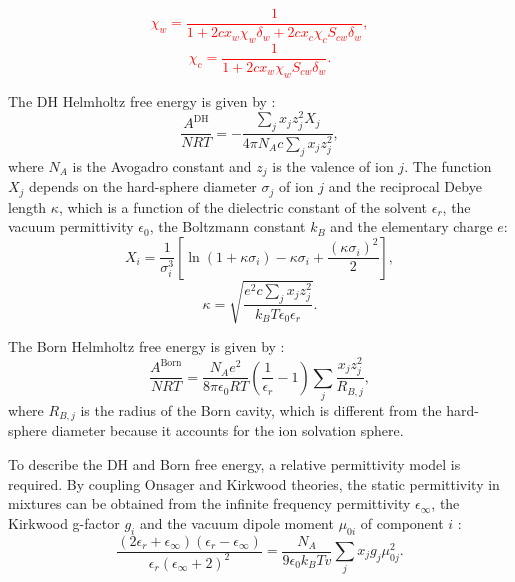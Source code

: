 \textcolor{red}{
\begin{equation}
     \chi_w = \frac{1}{1+2cx_w\chi_w\delta_w+2cx_c\chi_cS_{cw}\delta_w}, 
    \label{chiw_withCO2}
\end{equation}
\begin{equation}
    \chi_c = \frac{1}{1+2cx_w\chi_wS_{cw}\delta_w}.
    \label{chic}
\end{equation}
}

The DH Helmholtz free energy is given by \cite{Debye1923}: 
\begin{equation}
        \frac{A^\text{DH}}{NRT} = -\frac{\sum_j x_j z_j^2 X_j}{4\pi N_A c \sum_j x_j z_j^2}, 
        \label{Eq:ADH}
\end{equation}
where $N_A$ is the Avogadro constant and $z_j$ is the valence of ion $j$. The function $X_j$ depends on the hard-sphere diameter $\sigma_j$ of ion $j$ and the reciprocal Debye length $\kappa$, which is a function of the dielectric constant of the solvent $\epsilon_r$, the vacuum permittivity $\epsilon_0$, the Boltzmann constant $k_B$ and the elementary charge $e$:
\begin{equation}
        X_i = \frac{1}{\sigma_i^3} \left [ \ln { \left (1 + \kappa \sigma_i \right )} - \kappa \sigma_i + \frac{\left ( \kappa \sigma_i \right)^2}{2} \right ],
        \label{Eq:ADH_Xi}
\end{equation}
\begin{equation}
        \kappa = \sqrt{\frac{e^2c\sum_jx_jz_j^2}{k_BT\epsilon_0\epsilon_r}}.
        \label{Eq:ADH_debye}
\end{equation}

The Born Helmholtz free energy is given by \cite{Michelsen2004}: 
\begin{equation}
        \frac{A^\text{Born}}{NRT} = \frac{N_A e^2}{8\pi \epsilon_0RT } \left ( \frac{1}{\epsilon_r} - 1\right ) \sum_j \frac{x_jz_j^2}{R_{B,j}},
        \label{ABorn}
\end{equation}
where $R_{B,j}$ is the radius of the Born cavity, which is different from the hard-sphere diameter because it accounts for the ion solvation sphere.

To describe the DH and Born free energy, a relative permittivity model is required. By coupling Onsager and Kirkwood theories, the static permittivity in mixtures can be obtained from the infinite frequency permittivity $\epsilon_\infty$, the Kirkwood g-factor $g_i$ and the vacuum dipole moment $\mu_{0i}$ of component $i$ \cite{Davies1972}:
\begin{equation}
        \frac{\left (2\epsilon_r + \epsilon_\infty \right ) \left ( \epsilon_r - \epsilon_\infty \right )}{\epsilon_r\left ( \epsilon_\infty + 2 \right )^2} = \frac{N_A}{9\epsilon_0k_BTv}\sum_jx_jg_j\mu_{0j}^2.
        \label{Eq:eps}
\end{equation} 

